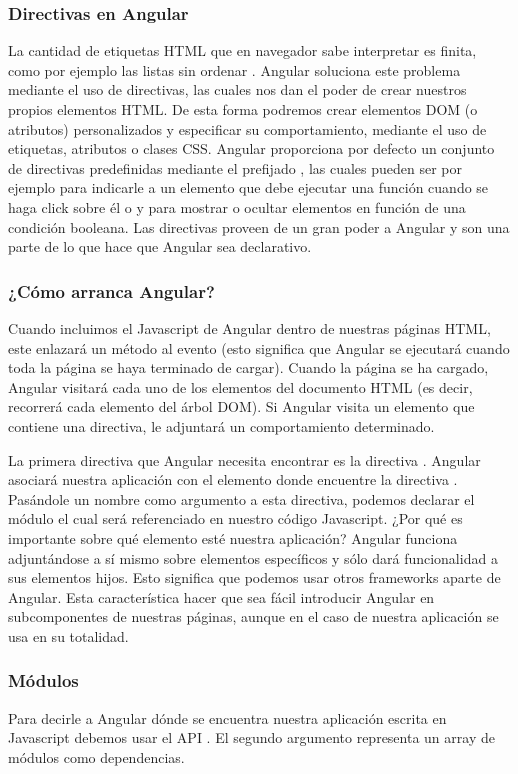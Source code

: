 \subsubsection{Directivas en Angular}
La cantidad de etiquetas HTML que en navegador sabe interpretar es finita, como por ejemplo las listas sin ordenar . Angular soluciona este problema mediante el uso de directivas, las cuales nos dan el poder de crear nuestros propios elementos HTML. De esta forma podremos crear elementos DOM (o atributos) personalizados y especificar su comportamiento, mediante el uso de etiquetas, atributos o clases CSS.
Angular proporciona por defecto un conjunto de directivas predefinidas mediante el prefijado , las cuales pueden ser por ejemplo  para indicarle a un elemento que debe ejecutar una función cuando se haga click sobre él o  y  para mostrar o ocultar elementos en función de una condición booleana.
Las directivas proveen de un gran poder a Angular y son una parte de lo que hace que Angular sea declarativo.

\subsubsection{¿Cómo arranca Angular?}
Cuando incluimos el Javascript de Angular dentro de nuestras páginas HTML, este enlazará un método al evento  (esto significa que Angular se ejecutará cuando toda la página se haya terminado de cargar). Cuando la página se ha cargado, Angular visitará cada uno de los elementos del documento HTML (es decir, recorrerá cada elemento del árbol DOM). Si Angular visita un elemento que contiene una directiva, le adjuntará un comportamiento determinado. 

La primera directiva que Angular necesita encontrar es la directiva . Angular asociará nuestra aplicación con el elemento donde encuentre la directiva . Pasándole un nombre como argumento a esta directiva, podemos declarar el módulo el cual será referenciado en nuestro código Javascript.
¿Por qué es importante sobre qué elemento esté nuestra aplicación? Angular funciona adjuntándose a sí mismo sobre elementos específicos y sólo dará funcionalidad a sus elementos hijos. Esto significa que podemos usar otros frameworks aparte de Angular. Esta característica hacer que sea fácil introducir Angular en subcomponentes de nuestras páginas,  aunque en el caso de nuestra aplicación se usa en su totalidad.

\subsubsection{Módulos}
Para decirle a Angular dónde se encuentra nuestra aplicación escrita en Javascript debemos usar el API . El segundo argumento representa un array de módulos como dependencias.

